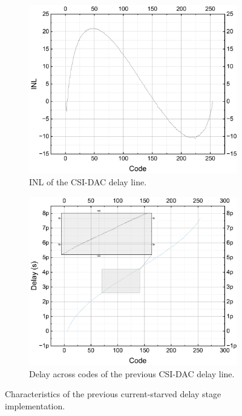 \begin{figure}[H]
  \begin{subfigure}{0.4\linewidth}
    \centering
    \includegraphics[width=\linewidth]{figures/Results/Previous Implementation-INL.png}
    \caption{INL of the CSI-DAC delay line.}
    \label{fig:current_starved_dac_inl}
  \end{subfigure}
  \begin{subfigure}{0.4\linewidth}
    \centering
    \includegraphics[width=\linewidth]{figures/Results/Previous Implementation-DelayAcrossCodesWithZoomIN.png}
    \caption{Delay across codes of the previous CSI-DAC delay line.}
    \label{fig:current_starved_dac_delay_range}
  \end{subfigure}
\caption{Characteristics of the previous current-starved delay stage implementation.}
\end{figure}

